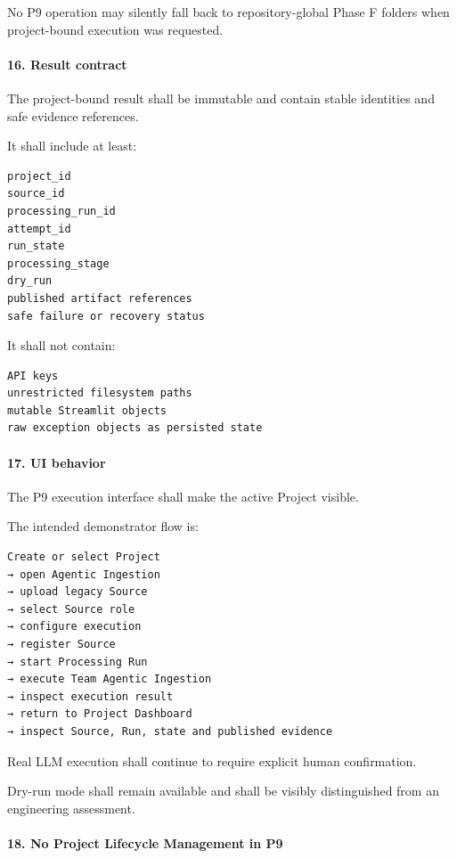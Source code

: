No P9 operation may silently fall back to repository-global Phase F folders when project-bound execution was requested.

\hypertarget{16-result-contract}{%
\paragraph{16. Result contract}\label{16-result-contract}}

The project-bound result shall be immutable and contain stable identities and safe evidence references.

It shall include at least:

\begin{verbatim}
project_id
source_id
processing_run_id
attempt_id
run_state
processing_stage
dry_run
published artifact references
safe failure or recovery status
\end{verbatim}

It shall not contain:

\begin{verbatim}
API keys
unrestricted filesystem paths
mutable Streamlit objects
raw exception objects as persisted state
\end{verbatim}

\hypertarget{17-ui-behavior}{%
\paragraph{17. UI behavior}\label{17-ui-behavior}}

The P9 execution interface shall make the active Project visible.

The intended demonstrator flow is:

\begin{verbatim}
Create or select Project
→ open Agentic Ingestion
→ upload legacy Source
→ select Source role
→ configure execution
→ register Source
→ start Processing Run
→ execute Team Agentic Ingestion
→ inspect execution result
→ return to Project Dashboard
→ inspect Source, Run, state and published evidence
\end{verbatim}

Real LLM execution shall continue to require explicit human confirmation.

Dry-run mode shall remain available and shall be visibly distinguished from an engineering assessment.

\hypertarget{18-no-project-lifecycle-management-in-p9}{%
\paragraph{18. No Project Lifecycle Management in P9}\label{18-no-project-lifecycle-management-in-p9}}

